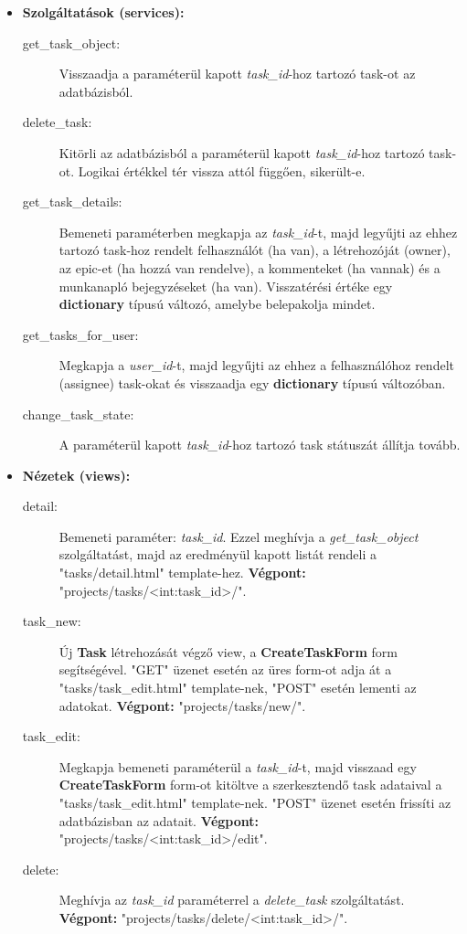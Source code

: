 \begin{itemize}
	\item \textbf{Szolgáltatások (services):}
	\begin{description}
		\item[get\_task\_object:] Visszaadja a paraméterül kapott \textit{task\_id}-hoz tartozó task-ot az adatbázisból.
		\item[delete\_task:] Kitörli az adatbázisból a paraméterül kapott \textit{task\_id}-hoz tartozó task-ot. Logikai értékkel tér vissza attól függően, sikerült-e.
		\item[get\_task\_details:] Bemeneti paraméterben megkapja az  \textit{task\_id}-t, majd legyűjti az ehhez tartozó task-hoz rendelt felhasználót (ha van), a létrehozóját (owner), az epic-et (ha hozzá van rendelve), a kommenteket (ha vannak) és a munkanapló bejegyzéseket (ha van). Visszatérési értéke egy \textbf{dictionary} típusú változó, amelybe belepakolja mindet.
		\item[get\_tasks\_for\_user:] Megkapja a \textit{user\_id}-t, majd legyűjti az ehhez a felhasználóhoz rendelt (assignee) task-okat és visszaadja egy \textbf{dictionary} típusú változóban.
		\item[change\_task\_state:] A paraméterül kapott \textit{task\_id}-hoz tartozó task státuszát állítja tovább.
	\end{description}
	\item \textbf{Nézetek (views):}
	\begin{description}
		\item[detail:] Bemeneti paraméter: \textit{task\_id}. Ezzel meghívja a \textit{get\_task\_object} szolgáltatást, majd az eredményül kapott listát rendeli a "tasks/detail.html" template-hez. \textbf{Végpont:} "projects/tasks/<int:task\_id>/".
		\item[task\_new:] Új \textbf{Task} létrehozását végző view, a \textbf{CreateTaskForm} form segítségével. "GET" üzenet esetén az üres form-ot adja át a "tasks/task\_edit.html" template-nek, "POST" esetén lementi az adatokat. \textbf{Végpont:} "projects/tasks/new/".
		\item[task\_edit:] Megkapja bemeneti paraméterül a \textit{task\_id}-t, majd visszaad egy \textbf{CreateTaskForm} form-ot kitöltve a szerkesztendő task adataival a "tasks/task\_edit.html" template-nek. "POST" üzenet esetén frissíti az adatbázisban az adatait. \textbf{Végpont:} "projects/tasks/<int:task\_id>/edit".
		\item[delete:] Meghívja az \textit{task\_id} paraméterrel a \textit{delete\_task} szolgáltatást. \textbf{Végpont:} "projects/tasks/delete/<int:task\_id>/".

\end{description}
\end{itemize}
